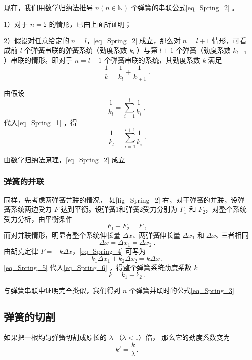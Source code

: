 现在，我们用数学归纳法推导 $n(n\in \mathbb N)$ 个弹簧的串联公式\autoref{eq_Spring_2} 。

1）对于 $n=2$ 的情形，已由上面所证明；

2）假设对任意给定的 $n=l$，\autoref{eq_Spring_2} 成立，那么对 $n=l+1$ 情形，可看成前 $l$ 个弹簧串联的弹簧系统（劲度系数 $k_l$ ）与第 $l+1$ 个弹簧（劲度系数 $ k_{l+1}$ ）串联的情形。即对于 $n=l+1$ 个弹簧串联的系统，其劲度系数 $k$ 满足
\begin{equation}\label{eq_Spring_1}
\frac{1}{k}=\frac{1}{k_l}+\frac{1}{k_{l+1}}~.
\end{equation}

由假设
\begin{equation}
\frac{1}{k_l}=\sum\limits_{i=1}^{l}\frac{1}{k_i}~,
\end{equation}
代入\autoref{eq_Spring_1} ，得
\begin{equation}
\frac{1}{k_l}=\sum\limits_{i=1}^{l+1}\frac{1}{k_i}~.
\end{equation}

由数学归纳法原理，\autoref{eq_Spring_2} 成立
\subsubsection{弹簧的并联}
同样，先考虑两弹簧并联的情况，
如\autoref{fig_Spring_2} 右，对于弹簧的并联，设弹簧系统两边受力 $F$ 达到平衡。设弹簧1和弹簧2受力分别为 $F_1$ 和 $F_2$，对整个系统受力分析，由平衡条件
\begin{equation}
F_1+F_2=F~,
\end{equation}
而对并联情形，明显有整个系统伸长量 $\Delta x$、两弹簧伸长量 $\Delta x_1$ 和 $\Delta x_2$ 三者相同
\begin{equation}\label{eq_Spring_5}
\Delta x=\Delta x_1=\Delta x_2~.
\end{equation}
由胡克定律 $F=-k\Delta x$，\autoref{eq_Spring_4} 可写为
\begin{equation}\label{eq_Spring_6}
k_1\Delta x_1+k_2\Delta x_2=k\Delta x~.
\end{equation}
\autoref{eq_Spring_5} 代入\autoref{eq_Spring_6} ，得整个弹簧系统劲度系数 $k$
\begin{equation}
k=k_1+k_2~.
\end{equation}

与弹簧串联中证明完全类似，我们得到 $n$ 个弹簧并联时的公式\autoref{eq_Spring_3} 

\subsection{弹簧的切割}
如果把一根均匀弹簧切割成原长的 $\lambda$ （$\lambda < 1$）倍， 那么它的劲度系数变为
\begin{equation}\label{eq_Spring_4}
k' = \frac{k}{\lambda}~.
\end{equation}

